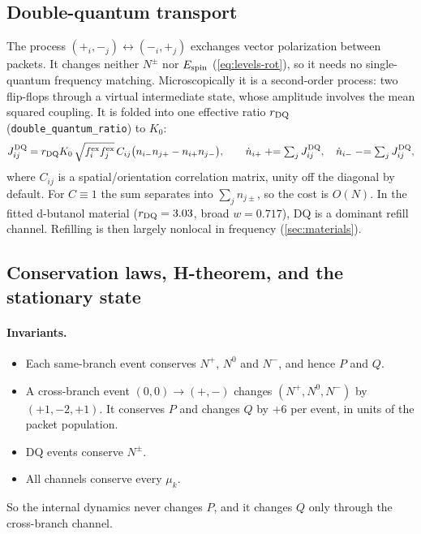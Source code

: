 \documentclass[11pt]{article}
\newcommand{\code}[1]{\texttt{#1}}
\begin{document}
\subsection{Double-quantum transport}
\label{sec:dq}

The process \((+_i,-_j)\leftrightarrow(-_i,+_j)\) exchanges vector polarization between packets.
It changes neither \(N^\pm\) nor \(E_{\rm spin}\) (\cref{eq:levels-rot}), so it needs no
single-quantum frequency matching. Microscopically it is a second-order process: two flip-flops
through a virtual intermediate state, whose amplitude involves the mean squared coupling. It is
folded into one effective ratio \(r_{\rm DQ}\) (\code{double\_quantum\_ratio}) to \(K_0\):
\begin{equation}
J^{\rm DQ}_{ij}=r_{\rm DQ}K_0\,\sqrt{f^{\rm ex}_if^{\rm ex}_j}\,C_{ij}\bigl(n_{i-}n_{j+}-n_{i+}n_{j-}\bigr),\qquad
\dot n_{i+}\mathrel{+}=\textstyle\sum_jJ^{\rm DQ}_{ij},\quad
\dot n_{i-}\mathrel{-}=\textstyle\sum_jJ^{\rm DQ}_{ij},
\label{eq:Jdq}
\end{equation}
where \(C_{ij}\) is a spatial/orientation correlation matrix, unity off the diagonal by default.
For \(C\equiv1\) the sum separates into \(\sum_jn_{j\pm}\), so the cost is \(O(N)\). In the
fitted d-butanol material (\(r_{\rm DQ}=3.03\), broad \(w=0.717\)), DQ is a dominant refill
channel. Refilling is then largely nonlocal in frequency (\cref{sec:materials}).

\subsection{Conservation laws, H-theorem, and the stationary state}
\label{sec:stationary}

\paragraph{Invariants.}
\begin{itemize}
\item Each same-branch event conserves \(N^+\), \(N^0\) and \(N^-\), and hence \(P\) and \(Q\).
\item A cross-branch event \((0,0)\to(+,-)\) changes \((N^+,N^0,N^-)\) by \((+1,-2,+1)\). It
conserves \(P\) and changes \(Q\) by \(+6\) per event, in units of the packet population.
\item DQ events conserve \(N^\pm\).
\item All channels conserve every \(\mu_k\).
\end{itemize}
So the internal dynamics never changes \(P\), and it changes \(Q\) only through the cross-branch
channel.
\end{document}
